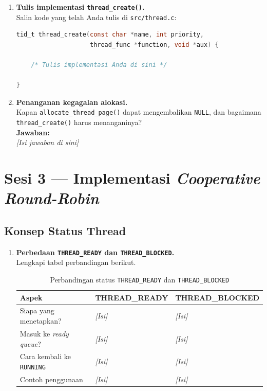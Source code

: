 \begin{enumerate}
    \item \textbf{Tulis implementasi \texttt{thread\_create()}.}\\
    Salin kode yang telah Anda tulis di \texttt{src/thread.c}:

    \begin{lstlisting}[language=c, caption={Implementasi \texttt{thread\_create()} oleh mahasiswa}]
tid_t thread_create(const char *name, int priority,
                    thread_func *function, void *aux) {

    /* Tulis implementasi Anda di sini */

}
    \end{lstlisting}

    \item \textbf{Penanganan kegagalan alokasi.}\\
    Kapan \texttt{allocate\_thread\_page()} dapat mengembalikan
    \texttt{NULL}, dan bagaimana \texttt{thread\_create()} harus
    menanganinya?\\[0.3cm]
    \textbf{Jawaban:}\\
    \textit{[Isi jawaban di sini]}

\end{enumerate}

\section{Sesi 3 --- Implementasi \textit{Cooperative Round-Robin}}

\subsection{Konsep Status Thread}

\begin{enumerate}

    \item \textbf{Perbedaan \texttt{THREAD\_READY} dan
    \texttt{THREAD\_BLOCKED}.}\\
    Lengkapi tabel perbandingan berikut.

    \begin{table}[!ht]
    \caption{Perbandingan status \texttt{THREAD\_READY} dan \texttt{THREAD\_BLOCKED}}
    \label{tab:h04-thread-status}
    \centering
    \begin{tabulary}{\linewidth}{|L|L|L|}
    \hline
    \textbf{Aspek} & \textbf{THREAD\_READY} & \textbf{THREAD\_BLOCKED} \\
    \hline
    Siapa yang menetapkan? & \textit{[Isi]} & \textit{[Isi]} \\
    \hline
    Masuk ke \textit{ready queue}? & \textit{[Isi]} & \textit{[Isi]} \\
    \hline
    Cara kembali ke \texttt{RUNNING} & \textit{[Isi]} & \textit{[Isi]} \\
    \hline
    Contoh penggunaan & \textit{[Isi]} & \textit{[Isi]} \\
    \hline
    \end{tabulary}
    \end{table}

\end{enumerate}

